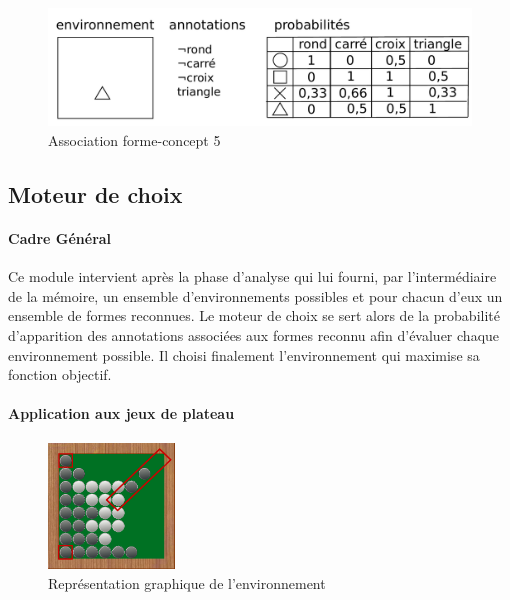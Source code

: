 \begin{figure}[H] 
\includegraphics[width=\textwidth]{files/raisonneur/annotations_5} 
\caption{Association forme-concept 5} 
\label{img_annotations_5}
\end{figure}



\subsection{Moteur de choix}

\paragraph{Cadre Général}


Ce module intervient après la phase d'analyse qui lui fourni, par l'intermédiaire de la mémoire, un ensemble d'environnements possibles et pour chacun d'eux un ensemble de formes reconnues. Le \og moteur de choix \fg{} se sert alors de la probabilité d'apparition des annotations associées aux formes reconnu afin d'évaluer chaque environnement possible. Il choisi finalement l'environnement qui maximise sa fonction objectif.

\paragraph{Application aux jeux de plateau}


\begin{figure}[H] 
\includegraphics[width=0.3\textwidth]{files/raisonneur/moteur_de_choix} 
\caption{Représentation graphique de l'environnement} 
\label{cbs_reco0}
\end{figure}
